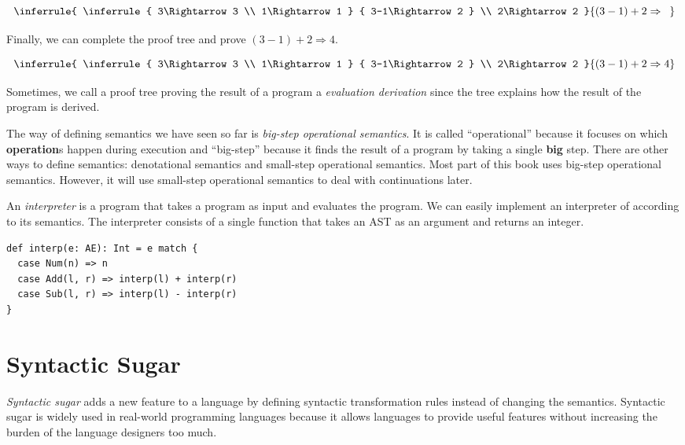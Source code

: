 \[
  \inferrule
  {
    \inferrule
    { 3\Rightarrow3 \\ 1\Rightarrow1 }
    { 3-1\Rightarrow2 }
    \\
    2\Rightarrow2
  }
  { (3-1)+2\Rightarrow{\color{white}4} }
\]

Finally, we can complete the proof tree and prove $(3-1)+2\Rightarrow4$.

\[
  \inferrule
  {
    \inferrule
    { 3\Rightarrow3 \\ 1\Rightarrow1 }
    { 3-1\Rightarrow2 }
    \\
    2\Rightarrow2
  }
  { (3-1)+2\Rightarrow4 }
\]

Sometimes, we call a proof tree proving the result of a program a
\textit{evaluation derivation}
since the tree explains how the result of the program is derived.

The way of defining semantics we have seen so far is \textit{big-step
operational semantics}. It is called
``operational'' because it focuses on which \textbf{operation}s happen during execution
and ``big-step'' because it finds the result of a program by taking a single
\textbf{big} step. There are other ways to define semantics: denotational
semantics and small-step operational semantics. Most part of this book uses
big-step operational semantics. However, it will use small-step operational
semantics to deal with continuations later.

An \textit{interpreter} is a program that takes a program as
input and evaluates the program. We can easily implement an interpreter of
\lang according to its semantics. The interpreter consists of a single function
that takes an AST as an argument and returns an integer.

\begin{verbatim}
def interp(e: AE): Int = e match {
  case Num(n) => n
  case Add(l, r) => interp(l) + interp(r)
  case Sub(l, r) => interp(l) - interp(r)
}
\end{verbatim}

\section{Syntactic Sugar}

\textit{Syntactic sugar} adds a new feature to a language
by defining syntactic transformation rules instead of changing the semantics.
Syntactic sugar is widely used in real-world programming languages because it
allows languages to provide useful features without increasing the burden of the
language designers too much.

